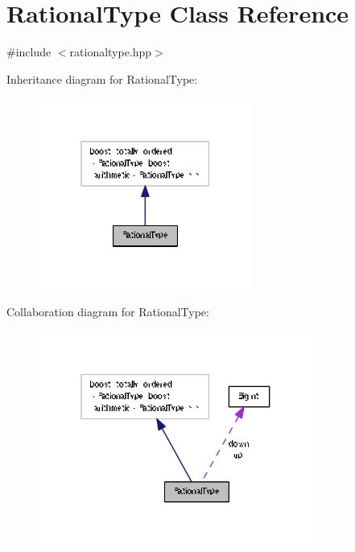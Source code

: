 \hypertarget{class_rational_type}{}\section{Rational\+Type Class Reference}
\label{class_rational_type}


{\ttfamily \#include $<$rationaltype.\+hpp$>$}



Inheritance diagram for Rational\+Type\+:\nopagebreak
\begin{figure}[H]
\begin{center}
\leavevmode
\includegraphics[width=199pt]{class_rational_type__inherit__graph}
\end{center}
\end{figure}


Collaboration diagram for Rational\+Type\+:\nopagebreak
\begin{figure}[H]
\begin{center}
\leavevmode
\includegraphics[width=256pt]{class_rational_type__coll__graph}
\end{center}
\end{figure}
